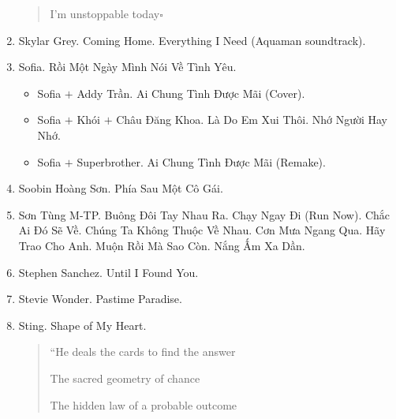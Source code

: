 \documentclass{article}
\begin{document}
\begin{enumerate}
\begin{quotation}
		I'm unstoppable today\hfill$\square$
	\end{quotation}
	\item {\sc Skylar Grey.} Coming Home. Everything I Need (Aquaman soundtrack).
	\item {\sc Sofia.} Rồi Một Ngày Mình Nói Về Tình Yêu.
	\begin{itemize}
		\item {\sc Sofia $+$ Addy Trần.} Ai Chung Tình Được Mãi (Cover).
		\item {\sc Sofia $+$ Khói $+$ Châu Đăng Khoa.} Là Do Em Xui Thôi. Nhớ Người Hay Nhớ.
		\item {\sc Sofia $+$ Superbrother.} Ai Chung Tình Được Mãi (Remake).
	\end{itemize}
	\item {\sc Soobin Hoàng Sơn.} Phía Sau Một Cô Gái.
	\item {\sc Sơn Tùng M-TP.} Buông Đôi Tay Nhau Ra. Chạy Ngay Đi (Run Now). Chắc Ai Đó Sẽ Về. Chúng Ta Không Thuộc Về Nhau. Cơn Mưa Ngang Qua. Hãy Trao Cho Anh. Muộn Rồi Mà Sao Còn. Nắng Ấm Xa Dần.
	\item {\sc Stephen Sanchez.} Until I Found You.
	\item {\sc Stevie Wonder.} Pastime Paradise.
	\item {\sc Sting.} Shape of My Heart.
	\begin{quotation}
		``He deals the cards to find the answer
		
		The sacred geometry of chance
		
		The hidden law of a probable outcome
		

\end{quotation}
\end{enumerate}
\end{document}
